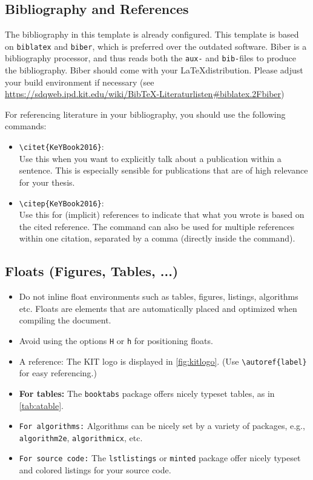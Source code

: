 \subsection{Bibliography and References}

The bibliography in this template is already configured. This template is based
on \texttt{biblatex} and \texttt{biber}, which is preferred over the outdated
 software. Biber is a bibliography processor, and thus reads both
the \texttt{aux-} and \texttt{bib-}files to produce the bibliography. Biber should
come with your \LaTeX distribution. Please adjust your build environment if
necessary (see
\url{https://sdqweb.ipd.kit.edu/wiki/BibTeX-Literaturlisten#biblatex.2Fbiber})

For referencing literature in your bibliography, you should use the following
commands:
\begin{itemize}
\item \verb+\citet{KeYBook2016}+: \citet{KeYBook2016}\\[.5ex]%
Use this when you want to explicitly talk about a publication within a sentence.
This is especially sensible for publications that are of high relevance for your thesis.
\item \verb+\citep{KeYBook2016}+: \citep{KeYBook2016}\\[.5ex]%
Use this for (implicit) references to indicate that what you wrote is based on the cited reference.
The command can also be used for multiple references within one citation, separated by a comma (directly inside the command).
\end{itemize}

\subsection{Floats (Figures, Tables, ...)}
\begin{itemize}
\item Do not inline float environments such as tables, figures, listings,
algorithms etc.
Floats are elements that are automatically placed and optimized when compiling
the document.
\item Avoid using the options \texttt{H} or \texttt{h} for positioning floats.
\item A reference: The KIT logo is displayed in \autoref{fig:kitlogo}. (Use
  \verb+\autoref{label}+ for easy referencing.)
\item \textbf{For tables:} The \texttt{booktabs} package offers nicely typeset
  tables, as in \autoref{tab:atable}.
\item \texttt{For algorithms:} Algorithms can be nicely set by a variety
  of packages, e.g., \texttt{algorithm2e}, \texttt{algorithmicx}, etc.
\item \texttt{For source code:} The \texttt{lstlistings} or \texttt{minted}
package offer nicely typeset and colored listings for your source code.
\end{itemize}

